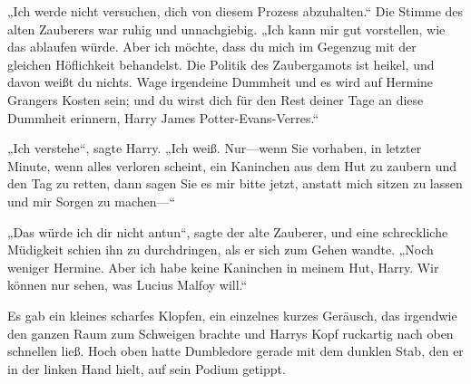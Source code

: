 \begin{em}
„Ich werde nicht versuchen, dich von diesem Prozess abzuhalten.“
Die Stimme des alten Zauberers war ruhig und unnachgiebig.
„Ich kann mir gut vorstellen, wie das ablaufen würde. Aber ich möchte, dass du mich im Gegenzug mit der gleichen Höflichkeit behandelst. Die Politik des Zaubergamots ist heikel, und davon weißt du nichts. Wage irgendeine Dummheit und es wird auf Hermine Grangers Kosten sein; und du wirst dich für den Rest deiner Tage an diese Dummheit erinnern, Harry James Potter-Evans-Verres.“

„Ich verstehe“, sagte Harry. „Ich weiß. Nur—wenn Sie vorhaben, in letzter Minute, wenn alles verloren scheint, ein Kaninchen aus dem Hut zu zaubern und den Tag zu retten, dann sagen Sie es mir bitte jetzt, anstatt mich sitzen zu lassen und mir Sorgen zu machen—“

„Das würde ich dir nicht antun“, sagte der alte Zauberer, und eine schreckliche Müdigkeit schien ihn zu durchdringen, als er sich zum Gehen wandte. „Noch weniger Hermine. Aber ich habe keine Kaninchen in meinem Hut, Harry. Wir können nur sehen, was Lucius Malfoy will.“
\end{em}

Es gab ein kleines scharfes Klopfen, ein einzelnes kurzes Geräusch, das irgendwie den ganzen Raum zum Schweigen brachte und Harrys Kopf ruckartig nach oben schnellen ließ. Hoch oben hatte Dumbledore gerade mit dem dunklen Stab, den er in der linken Hand hielt, auf sein Podium getippt.

